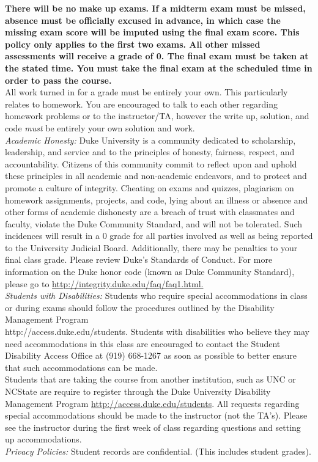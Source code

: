 \documentclass[11pt]{article}
\begin{document}
\textbf{There will be no make up exams. If a midterm exam must be missed, absence must be officially excused in advance, in which case the missing exam score will be imputed using the final exam score. This policy only applies to the first \textbf{two} exams. All other missed assessments will receive a grade of 0. The final exam must be taken at the stated time. You must take the final exam at the scheduled time in order to pass the course.}\\

All work turned in for a grade must be entirely your own. This particularly relates to homework. You are encouraged to talk to each other regarding homework problems or to the instructor/TA, however the write up, solution, and code \emph{must} be entirely your own solution and work. \\


\emph{Academic Honesty:} Duke University is a community dedicated to scholarship, leadership, and service and to the principles of honesty, fairness, respect, and accountability. Citizens of this community commit to reflect upon and uphold these principles in all academic and non-academic endeavors, and to protect and promote a culture of integrity. Cheating on exams and quizzes, plagiarism on homework assignments, projects, and code, lying about an illness or absence and other forms of academic dishonesty are a breach of trust with classmates and faculty, violate the Duke Community Standard, and will not be tolerated. Such incidences will result in a 0 grade for all parties involved as well as being reported to the University Judicial Board. Additionally, there may be penalties to your final class grade. Please review Duke's Standards of Conduct.
For more information on the Duke honor code (known as Duke Community Standard), please go to \url{http://integrity.duke.edu/faq/faq1.html.}\\


\emph{Students with Disabilities:} Students who require special accommodations in class or during exams should follow the procedures outlined by the Disability Management Program \\ http://access.duke.edu/students. Students with disabilities who believe they may need accommodations in this class are encouraged to contact the Student Disability Access Office at (919) 668-1267 as soon as possible to better ensure that such accommodations can be made. \\

Students that are taking the course from another institution, such as UNC or NCState are require to register through the Duke University Disability Management Program \url{http://access.duke.edu/students}. All requests regarding special accommodations should be made to the instructor (not the TA's). Please see the instructor during the first week of class regarding questions and setting up accommodations. \\

\emph{Privacy Policies:} 
Student records are confidential. (This includes student grades). 
\end{document}
